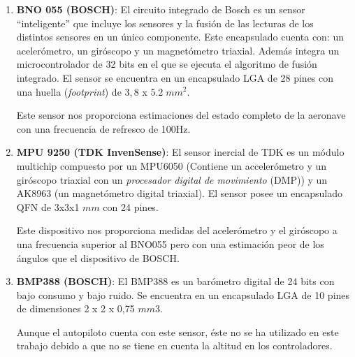 \begin{enumerate}
	\item \textbf{BNO 055 (BOSCH)}: El circuito integrado de Bosch es un sensor ``inteligente'' que incluye los sensores y la fusión de las lecturas de los distintos sensores en un único componente. Este encapsulado cuenta con: un acelerómetro, un giróscopo y un magnetómetro triaxial. Además integra un microcontrolador de 32 bits en el que se ejecuta el algoritmo de fusión integrado. El sensor se encuentra en un encapsulado LGA de 28 pines con una huella (\textit{footprint}) de $3,8$ x $5.2\; mm^2$.
	
	Este sensor nos proporciona estimaciones del estado completo de la aeronave con una frecuencia de refresco de 100Hz. 
	
	\item \textbf{MPU 9250 (TDK InvenSense)}: El sensor inercial de TDK es un módulo multichip compuesto por un MPU6050 (Contiene un accelerómetro y un giróscopo triaxial con un \textit{procesador digital de movimiento} (DMP)) y un  AK8963 (un magnetómetro digital triaxial). El sensor posee un encapsulado QFN de 3x3x1 $mm$ con 24 pines.
	
	Este dispositivo nos proporciona medidas del acelerómetro y el giróscopo a una frecuencia superior al BNO055 pero con una estimación peor de los ángulos que el dispositivo de BOSCH.
	
	\item \textbf{BMP388 (BOSCH)}: El BMP388 es un barómetro digital de 24 bits con bajo consumo y bajo ruido. Se encuentra en un encapsulado LGA de 10 pines de dimensiones 2 x 2 x 0,75 $mm3$.
	
	Aunque el autopiloto cuenta con este sensor, éste no se ha utilizado en este trabajo debido a que no se tiene en cuenta la altitud en los controladores.
	
\end{enumerate}

